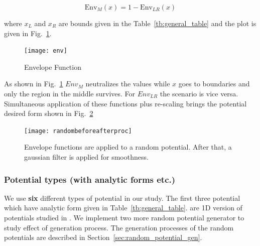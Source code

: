 \documentclass[a4paper,times,hidelinks,12pt]{article}
\begin{document}
\begin{equation}
\label{eq:envelope_potential_m}
    \text{Env}_{M}(x) = 1 - \text{Env}_{LR}(x)
\end{equation}

where $x_L$ and $x_R$ are bounds given in the Table~\eqref{tb:general_table} and the plot is given in Fig.~\ref{fig:envelope_and_random_withot_pros}.  

\graphicspath{{"../figs/potentials/"}}
\begin{figure}[H]
\centering
\texttt{[image: env]}
\caption{Envelope Function}
\label{fig:envelope_and_random_withot_pros}
\end{figure}

As shown in Fig.~\ref{fig:envelope_and_random_withot_pros} $Env_{M}$ neutralizes the values while $x$ goes to boundaries and only the region in the middle survives. For $Env_{LR}$ the scenario is vice versa. Simultaneous application of these functions plus re-scaling brings the potential desired form shown in Fig.~\ref{fig:random_plus_envelope}


\graphicspath{{"../figs/potentials/"}}
\begin{figure}[H]
    \texttt{[image: randombeforeafterproc]}
\caption{Envelope functions are applied to a random potential. After that, a gaussian filter is applied for smoothness.}
\label{fig:random_plus_envelope}
\end{figure}





\subsubsection{Potential types (with analytic forms etc.)}

We use \textbf{six} different types of potential in our study. The first three potential which have analytic form given in Table~\ref{tb:general_table}. are 1D version of potentials studied in \cite{mills2017deep}. We implement two more random potential generator to study effect of generation process. The generation processes of the random potentials are described in Section~\ref{sec:random_potential_gen}.

\newcommand{\infinitewell}{$
V(x) = 
    \begin{cases}
       0 &\quad\text{if } x_l < x < x_r  \\
       \infty &\quad\text{if } \textit{otherwise} \\
    \end{cases}
$}
\end{document}
